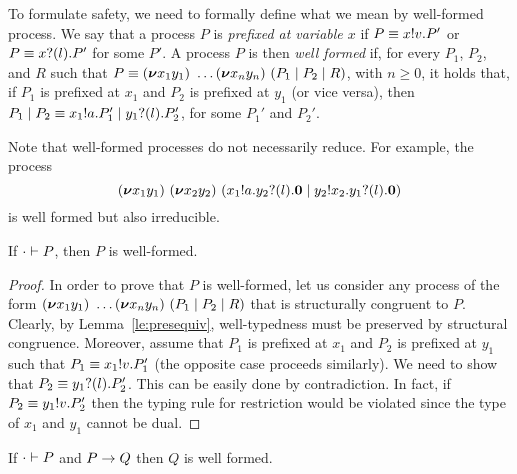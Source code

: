 To formulate safety, we need to formally define what we mean by
well-formed process.  We say that a process \( P \) is \emph{prefixed
  at variable \( x \)} if \( P\equiv x ! v . P' \) or
\( P\equiv x ? (l) . P' \) for some $P'$.
%
A process $P$ is then \emph{well formed} if, for every $P_1$, $P_2$,
and $R$ such that
\( P\equiv (\bm{\nu} x_1y_1)~\dots
  (\bm{\nu} x_ny_n)~(P_1 \mid P_2 \mid R) \), with
\( n \geq 0 \), it holds that, if \( P_1 \) is prefixed at \( x_1 \)
and \( P_2 \) is prefixed at \( y_1 \) (or vice versa), then
\( P_1 \mid P_2
\equiv x_1 ! a . P_1' \mid y_1 ? (l) . P_2' \), for some
$P_1'$ and $P_2'$.

Note that well-formed processes do not necessarily reduce. For example, the process
\begin{equation*}
  (\bm{\nu} x_1y_1)~(\bm{\nu} x_2y_2)~(x_1 ! a . y_2 ? (l) . \bm{0} \mid y_2 ! x_2 . y_1 ? (l) . \bm{0})
\end{equation*}
is well formed but also irreducible.

\begin{theorem}
  If \( \cdot \vdash P \), then \( P \) is well-formed.
\end{theorem}
\begin{proof}
  In order to prove that $P$ is well-formed, let us consider any
  process of the form
  $(\bm{\nu} x_1y_1)~\dots
    (\bm{\nu} x_ny_n)~(P_1 \mid P_2 \mid R)$ that is
  structurally congruent to $P$. Clearly, by Lemma~\ref{le:presequiv},
  well-typedness must be preserved by structural congruence. Moreover,
  assume that $P_1$ is prefixed at $x_1$ and $P_2$ is prefixed at
  $y_1$ such that $P_1 \equiv x_1 ! v . P_1'$ (the opposite
  case proceeds similarly). We need to show that
  $P_2 \equiv y_1 ? (l) . P_2'$. This can be easily done by
  contradiction. In fact, if $P_2 \equiv y_1 ! v . P_2'$ then
  the typing rule for restriction would be violated since the type of
  $x_1$ and $y_1$ cannot be dual.
\end{proof}

\begin{corollary}
  If \( \cdot \vdash P \) and \( P \rightarrow Q \) then \( Q \) is well formed.
\end{corollary}